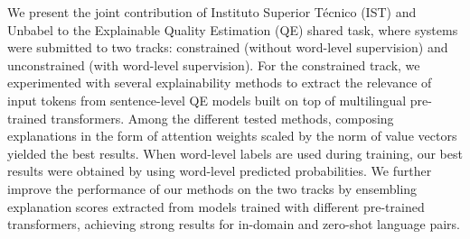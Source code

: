 We present the joint contribution of Instituto Superior Técnico (IST) and Unbabel to the Explainable Quality Estimation (QE) shared task, where systems were submitted to two tracks: constrained (without word-level supervision) and unconstrained (with word-level supervision). For the constrained track, we experimented with several explainability methods to extract the relevance of input tokens from sentence-level QE models built on top of multilingual pre-trained transformers. Among the different tested methods, composing explanations in the form of attention weights scaled by the norm of value vectors yielded the best results. When word-level labels are used during training, our best results were obtained by using word-level predicted probabilities. We further improve the performance of our methods on the two tracks by ensembling explanation scores extracted from models trained with different pre-trained transformers, achieving strong results for in-domain and zero-shot language pairs.
